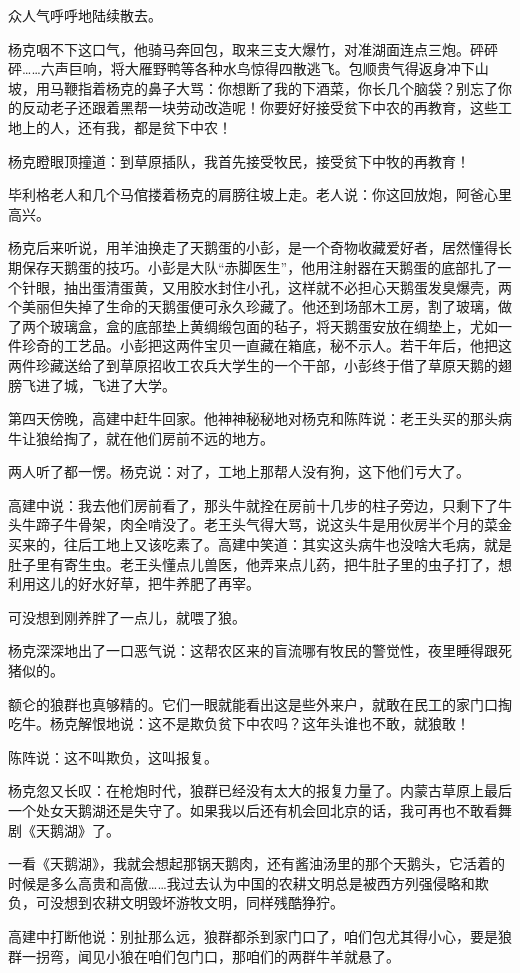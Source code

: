 \par 众人气呼呼地陆续散去。
\par 杨克咽不下这口气，他骑马奔回包，取来三支大爆竹，对准湖面连点三炮。砰砰砰……六声巨响，将大雁野鸭等各种水鸟惊得四散逃飞。包顺贵气得返身冲下山坡，用马鞭指着杨克的鼻子大骂：你想断了我的下酒菜，你长几个脑袋？别忘了你的反动老子还跟着黑帮一块劳动改造呢！你要好好接受贫下中农的再教育，这些工地上的人，还有我，都是贫下中农！
\par 杨克瞪眼顶撞道：到草原插队，我首先接受牧民，接受贫下中牧的再教育！
\par 毕利格老人和几个马倌搂着杨克的肩膀往坡上走。老人说：你这回放炮，阿爸心里高兴。
\par 杨克后来听说，用羊油换走了天鹅蛋的小彭，是一个奇物收藏爱好者，居然懂得长期保存天鹅蛋的技巧。小彭是大队“赤脚医生”，他用注射器在天鹅蛋的底部扎了一个针眼，抽出蛋清蛋黄，又用胶水封住小孔，这样就不必担心天鹅蛋发臭爆壳，两个美丽但失掉了生命的天鹅蛋便可永久珍藏了。他还到场部木工房，割了玻璃，做了两个玻璃盒，盒的底部垫上黄绸缎包面的毡子，将天鹅蛋安放在绸垫上，尤如一件珍奇的工艺品。小彭把这两件宝贝一直藏在箱底，秘不示人。若干年后，他把这两件珍藏送给了到草原招收工农兵大学生的一个干部，小彭终于借了草原天鹅的翅膀飞进了城，飞进了大学。
\par 第四天傍晚，高建中赶牛回家。他神神秘秘地对杨克和陈阵说：老王头买的那头病牛让狼给掏了，就在他们房前不远的地方。
\par 两人听了都一愣。杨克说：对了，工地上那帮人没有狗，这下他们亏大了。
\par 高建中说：我去他们房前看了，那头牛就拴在房前十几步的柱子旁边，只剩下了牛头牛蹄子牛骨架，肉全啃没了。老王头气得大骂，说这头牛是用伙房半个月的菜金买来的，往后工地上又该吃素了。高建中笑道：其实这头病牛也没啥大毛病，就是肚子里有寄生虫。老王头懂点儿兽医，他弄来点儿药，把牛肚子里的虫子打了，想利用这儿的好水好草，把牛养肥了再宰。
\par 可没想到刚养胖了一点儿，就喂了狼。
\par 杨克深深地出了一口恶气说：这帮农区来的盲流哪有牧民的警觉性，夜里睡得跟死猪似的。
\par 额仑的狼群也真够精的。它们一眼就能看出这是些外来户，就敢在民工的家门口掏吃牛。杨克解恨地说：这不是欺负贫下中农吗？这年头谁也不敢，就狼敢！
\par 陈阵说：这不叫欺负，这叫报复。
\par 杨克忽又长叹：在枪炮时代，狼群已经没有太大的报复力量了。内蒙古草原上最后一个处女天鹅湖还是失守了。如果我以后还有机会回北京的话，我可再也不敢看舞剧《天鹅湖》了。
\par 一看《天鹅湖》，我就会想起那锅天鹅肉，还有酱油汤里的那个天鹅头，它活着的时候是多么高贵和高傲……我过去认为中国的农耕文明总是被西方列强侵略和欺负，可没想到农耕文明毁坏游牧文明，同样残酷狰狞。
\par 高建中打断他说：别扯那么远，狼群都杀到家门口了，咱们包尤其得小心，要是狼群一拐弯，闻见小狼在咱们包门口，那咱们的两群牛羊就悬了。


